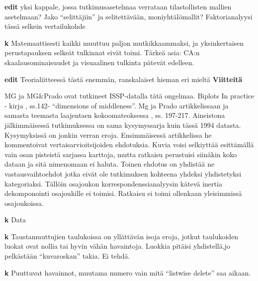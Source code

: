 \documentclass[
  finnish,
]{book}
\begin{document}
\textbf{edit} yksi kappale, jossa tutkimusasetelmaa verrataan tilastollisten mallien
asetelmaan? Jako ``selittäjiin'' ja selitettävään, moniyhtälömallit?
Faktorianalyysi tässä selkein vertailukohde

\textbf{k} Matemaattisesti kaikki muuttuu paljon mutkikkaammaksi, ja yksinkertaisen
perustapauksen selkeät tulkinnat eivät toimi. Tärkeä asia: CA:n skaalausominaisuudet ja
visuaalinen tulkinta pätevät edelleen.

\textbf{edit} Teorialiitteessä tästä enemmän, ranskalaiset hieman eri mieltä
\textbf{Viitteitä}

MG ja MG\&Prado ovat tutkineet ISSP-datalla tätä ongelmaa.
Biplots In practice - kirja \citep{RefWorks:doc:5a857a43e4b0ed2d44664d7c}, ss.142-
``dimensions of middleness''. Mg ja Prado artikkelissaan
\citep{RefWorks:doc:5a857a44e4b0ed2d44664d87} ja samasta teemasta laajentaen
kokoomateoksessa \citep{RefWorks:doc:5ab76b43e4b003f4468d1f07}, ss. 197-217.
Aineistona jälkimmäisessä tutkimuksessa on sama kysymyssarja kuin tässä 1994
datasta. Kysymyksissä on jonkin verran eroja. Ensimmäisessä artikkelissa he kommentoivat vertaisarvioitsijoiden ehdotuksia. Kuvia voisi selkiyttää esittämällä vain osan
pisteistä sarjassa karttoja, mutta ratkaisu perustuisi siinäkin koko dataan ja
sitä nimenomaan ei haluta. Toinen ehdotus on yhdistää ne vastausvaihtoehdot jotka
eivät ole tutkimuksen kohteena yhdeksi yhdistetyksi kategoriaksi. Tällöin osajoukon
korrespondenssianalyysin kätevä inertia dekomponointi osajoukille ei toimisi. Ratkaisu
ei toimi ollenkaan yleisimmissä osajoukoissa.

\textbf{k} Data

\textbf{k} Taustamuuttujien taulukoissa on yllättävän isoja eroja, jotkut taulukoiden luokat
ovat nollia tai hyvin vähän havaintoja. Luokkia pitäisi yhdistellä,jo pelkästään
``kuvaroskan'' takia. Ei tehdä.

\textbf{k} Puuttuvat havainnot, muutama numero vain mitä ``listwise delete'' saa aikaan.
\end{document}
